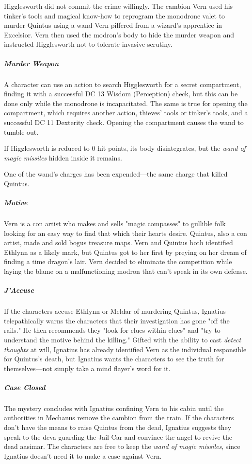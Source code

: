 \documentclass[10pt,a4paper,twoside,bg=print,twocolumn,openany,nodeprecatedcode]{dndbook}
\begin{document}
Higglesworth did not commit the crime willingly. The cambion Vern used his tinker's tools and magical know-how to reprogram the monodrone valet to murder Quintus using a wand Vern pilfered from a wizard's apprentice in Excelsior. Vern then used the modron's body to hide the murder weapon and instructed Higglesworth not to tolerate invasive scrutiny.

\subparagraph{Murder Weapon}
A character can use an action to search Higglesworth for a secret compartment, finding it with a successful DC 13 Wisdom (Perception) check, but this can be done only while the monodrone is incapacitated. The same is true for opening the compartment, which requires another action, thieves' tools or tinker's tools, and a successful DC 11 Dexterity check. Opening the compartment causes the wand to tumble out.

If Higglesworth is reduced to 0 hit points, its body disintegrates, but the \textit{wand of magic missiles} hidden inside it remains.

One of the wand's charges has been expended—the same charge that killed Quintus.

\subparagraph{Motive}
Vern is a con artist who makes and sells "magic compasses" to gullible folk looking for an easy way to find that which their hearts desire. Quintus, also a con artist, made and sold bogus treasure maps. Vern and Quintus both identified Ethlynn as a likely mark, but Quintus got to her first by preying on her dream of finding a time dragon's lair. Vern decided to eliminate the competition while laying the blame on a malfunctioning modron that can't speak in its own defense.

\subparagraph{J'Accuse}
If the characters accuse Ethlynn or Meldar of murdering Quintus, Ignatius telepathically warns the characters that their investigation has gone "off the rails." He then recommends they "look for clues within clues" and "try to understand the motive behind the killing." Gifted with the ability to cast \textit{detect thoughts} at will, Ignatius has already identified Vern as the individual responsible for Quintus's death, but Ignatius wants the characters to see the truth for themselves—not simply take a mind flayer's word for it.

\subparagraph{Case Closed}
The mystery concludes with Ignatius confining Vern to his cabin until the authorities in Mechanus remove the cambion from the train. If the characters don't have the means to raise Quintus from the dead, Ignatius suggests they speak to the deva guarding the Jail Car and convince the angel to revive the dead aasimar. The characters are free to keep the \textit{wand of magic missiles}, since Ignatius doesn't need it to make a case against Vern.
\end{document}
